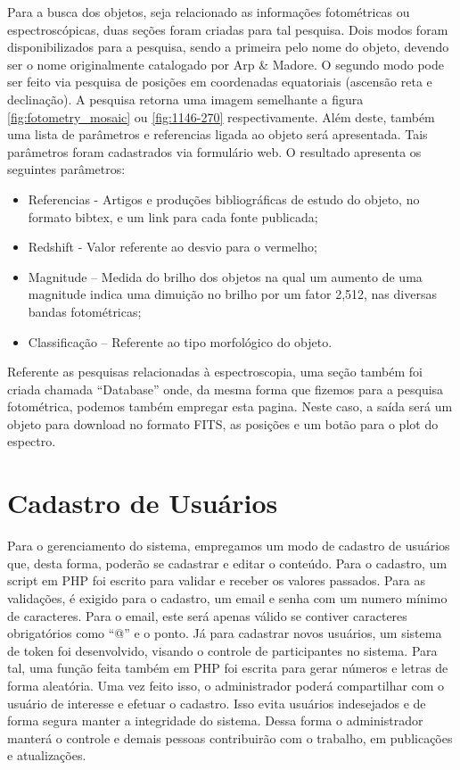 Para a busca dos objetos, seja relacionado as informações fotométricas ou espectroscópicas, duas seções foram criadas para tal pesquisa. Dois modos foram disponibilizados para a pesquisa, sendo a primeira pelo nome do objeto, devendo ser o nome originalmente catalogado por Arp \& Madore. O segundo modo pode ser feito via pesquisa de posições em coordenadas equatoriais (ascensão reta e declinação). A pesquisa retorna uma imagem semelhante a figura \ref{fig:fotometry_mosaic} ou \ref{fig:1146-270} respectivamente. Além deste, também uma lista de parâmetros e referencias ligada ao objeto será apresentada. Tais parâmetros foram cadastrados via formulário web. O resultado apresenta os seguintes parâmetros:

\begin{itemize}

\item Referencias - Artigos e produções bibliográficas de estudo do objeto, no formato bibtex, e um link para cada fonte publicada;

\item Redshift - Valor referente ao desvio para o vermelho;

\item Magnitude – Medida do brilho dos objetos na qual um aumento de uma magnitude indica uma dimuição no brilho por um fator 2,512, nas diversas bandas fotométricas;

\item Classificação – Referente ao tipo morfológico do objeto.
\end{itemize}

Referente as pesquisas relacionadas à espectroscopia, uma seção também foi criada chamada “Database” onde, da mesma forma que fizemos para a pesquisa fotométrica, podemos também empregar esta pagina. Neste caso, a saída será um objeto para download no formato FITS, as posições e um botão para o plot do espectro. 


\section{Cadastro de Usuários}

Para o gerenciamento do sistema, empregamos um modo de cadastro de usuários que, desta forma, poderão se cadastrar e editar o conteúdo. Para o cadastro, um script em PHP foi escrito para validar e receber os valores passados. Para as validações, é exigido para o cadastro, um email e senha com um numero mínimo de caracteres. Para o email, este será apenas válido se contiver caracteres obrigatórios como “@” e o ponto. Já para cadastrar novos usuários, um sistema de token foi desenvolvido, visando o controle de participantes no sistema. Para tal, uma função feita também em PHP foi escrita para gerar números e letras de forma aleatória. Uma vez feito isso, o administrador poderá compartilhar com o usuário de interesse e efetuar o cadastro. Isso evita usuários indesejados e de forma segura manter a integridade do sistema. Dessa forma o administrador manterá o controle e demais pessoas contribuirão com o trabalho, em publicações e atualizações.


